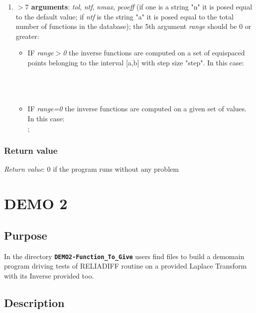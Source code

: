 \documentclass[10pt]{article}
\begin{document}
\begin{enumerate}
	\item \textbf{$>7$ arguments}: \emph{tol}, \emph{ntf}, \emph{nmax}, \emph{pcoeff} (if one is a string "n" it is posed equal to the default value; if \emph{ntf} is the string "a" it is posed equal to the total number of functions in the database); the  5\textendash th argument \emph{range} should be 0 or greater:
	\begin{itemize}
	 \item IF \emph{range$>$0} the inverse functions are computed on a set of equispaced points belonging to the interval [a,b] with step size "step". In this case:\\
		  \\
		  \\
		  \\
	\item IF \emph{range=0} the inverse functions are computed on a given set of values. In this case:\\
		  ;\\
	\end{itemize}



\end{enumerate}


\subsubsection{Return value}
\emph{Return value}: 0 if the program runs without any problem


\section{DEMO 2}

\subsection{Purpose}
In the directory \textbf{{\tt DEMO2-Function\_To\_Give}} users find files to build a demo\textendash main program driving tests of RELIADIFF routine on a provided Laplace Transform with its Inverse provided too.
\subsection{Description}
\end{document}

